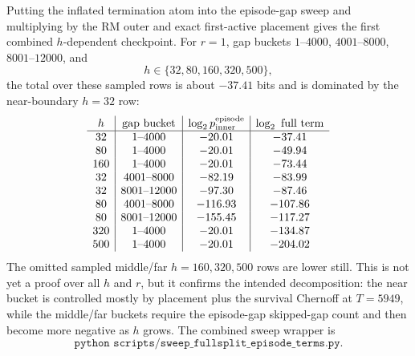 Putting the inflated termination atom into the episode-gap sweep and multiplying by the RM outer and exact first-active
placement gives the first combined \(h\)-dependent checkpoint.  For \(r=1\), gap buckets
\(1\text{--}4000\), \(4001\text{--}8000\), \(8001\text{--}12000\), and
\[
h\in\{32,80,160,320,500\},
\]
the total over these sampled rows is about \(-37.41\) bits and is dominated by the near-boundary \(h=32\) row:
\[
\begin{array}{c|c|c|c}
h & \text{gap bucket} & \log_2 p_{\rm inner}^{\rm episode} & \log_2\text{ full term}\\
\hline
32 & 1\text{--}4000 & -20.01 & -37.41\\
80 & 1\text{--}4000 & -20.01 & -49.94\\
160 & 1\text{--}4000 & -20.01 & -73.44\\
32 & 4001\text{--}8000 & -82.19 & -83.99\\
32 & 8001\text{--}12000 & -97.30 & -87.46\\
80 & 4001\text{--}8000 & -116.93 & -107.86\\
80 & 8001\text{--}12000 & -155.45 & -117.27\\
320 & 1\text{--}4000 & -20.01 & -134.87\\
500 & 1\text{--}4000 & -20.01 & -204.02
\end{array}
\]
The omitted sampled middle/far \(h=160,320,500\) rows are lower still.  This is not yet a proof over all \(h\) and \(r\),
but it confirms the intended decomposition: the near bucket is controlled mostly by placement plus the survival
Chernoff at \(T=5949\), while the middle/far buckets require the episode-gap skipped-gap count and then become more
negative as \(h\) grows.  The combined sweep wrapper is
\[
\texttt{python scripts/sweep\_fullsplit\_episode\_terms.py}.
\]

